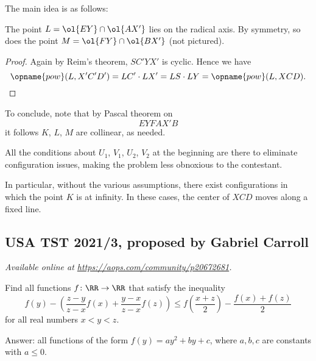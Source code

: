 \documentclass[11pt]{scrartcl}
\begin{document}
The main idea is as follows:
\begin{claim*}
  The point $L = \ol{EY} \cap \ol{AX'}$ lies on the radical axis.
  By symmetry, so does the point $M = \ol{FY} \cap \ol{BX'}$ (not pictured).
\end{claim*}
\begin{proof}
  Again by Reim's theorem, $SC'YX'$ is cyclic.
  Hence we have
  \[ \opname{pow}(L, X'C'D') = LC' \cdot LX'
    = LS \cdot LY = \opname{pow}(L, XCD). \qedhere \]
\end{proof}

To conclude, note that by Pascal theorem on
\[ EYFAX'B \]
it follows $K$, $L$, $M$ are collinear,
as needed.

\begin{remark*}
  All the conditions about $U_1$, $V_1$, $U_2$, $V_2$
  at the beginning are there to eliminate configuration issues,
  making the problem less obnoxious to the contestant.

  In particular, without the various assumptions,
  there exist configurations in which the point $K$ is at infinity.
  In these cases, the center of $XCD$ moves along a fixed line.
\end{remark*}
\pagebreak

\subsection{USA TST 2021/3, proposed by Gabriel Carroll}
\textsl{Available online at \url{https://aops.com/community/p20672681}.}
\begin{mdframed}[style=mdpurplebox,frametitle={Problem statement}]
Find all functions $f \colon \RR \to \RR$ that satisfy the inequality
\[
  f(y) -
  \left(\frac{z-y}{z-x} f(x) + \frac{y-x}{z-x}f(z)\right) \leq
  f\left(\frac{x+z}{2}\right) - \frac{f(x)+f(z)}{2}
\]
for all real numbers $x < y < z$.
\end{mdframed}
Answer: all functions of the form $f(y) = a y^2 + by + c$, where
$a, b, c$ are constants with $a \leq 0$.
\end{document}
